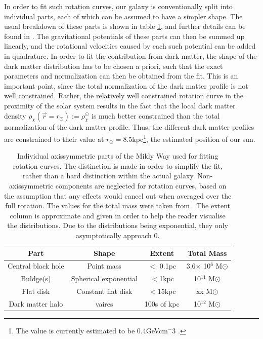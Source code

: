 In order to fit such rotation curves, our galaxy is conventionally split into individual parts, each of which can be assumed to have a simpler shape. The usual breakdown of these parts is shown in table \ref*{tab:MilkyWayBreakdown}, and further details can be found in \cite{Sofue_2016}. The gravitational potentials of these parts can then be summed up linearly, and the rotational velocities caused by each such potential can be added in quadrature. In order to fit the contribution from dark matter, the shape of the dark matter distribution has to be chosen a priori, such that the exact parameters and normalization can then be obtained from the fit. This is an important point, since the total normalization of the dark matter profile is not well constrained. Rather, the relatively well constrained rotation curve in the proximity of the solar system results in the fact that the local dark matter density $\rho_\chi(\vec{r}=r_\odot) := \rho_\chi^\odot$ is much better constrained than the total normalization of the dark matter profile. Thus, the different dark matter profiles are constrained to their value at $r_\odot = 8.5$kpc\footnote{The value is currently estimated to be 0.4GeVcm$^-3$ \cite{}.}, the estimated position of our sun. \\
\begin{table}[h]
    \centering
    \begin{tabular}{|c|c|c|c|}
        \hline
        Part & Shape & Extent & Total Mass \\
        \hline
        Central black hole & Point mass & $<$ 0.1pc & 3.6$\times$ 10$^6$ M$\odot$ \\
        \hline
        Buldge(s) & Spherical exponential & $<$1kpc & 10$^{11}$ M$\odot$ \\
        \hline
        Flat disk & Constant flat disk & $<15$kpc & xx M$\odot$ \\
        \hline
        Dark matter halo & vaires & 100s of kpc & 10$^{12}$ M$\odot$ \\
        \hline
    \end{tabular}
    \label{tab:MilkyWayBreakdown}
    \caption{Individual axissymmetric parts of the Mikly Way used for fitting rotation curves. The distinction is made in order to simplify the fit, rather than a hard distinction within the actual galaxy. Non-axissymmetric components are neglected for rotation curves, based on the assumption that any effects would cancel out when averaged over the full rotation. The values for the total mass were taken from \cite{Sofue_2016}. The extent column is approximate and given in order to help the reader visualise the distributions. Due to the distributions being exponential, they only asymptotically approach 0.}

\end{table}

